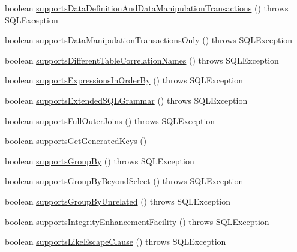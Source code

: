 \begin{DoxyCompactItemize}
\item 
boolean \mbox{\hyperlink{classcom_1_1mysql_1_1jdbc_1_1_database_meta_data_a661e1614b3b0914c06d415bf42e2791a}{supports\+Data\+Definition\+And\+Data\+Manipulation\+Transactions}} ()  throws S\+Q\+L\+Exception 
\item 
boolean \mbox{\hyperlink{classcom_1_1mysql_1_1jdbc_1_1_database_meta_data_aac4b26ebdbb4f45c9e05b77a6a2a0acf}{supports\+Data\+Manipulation\+Transactions\+Only}} ()  throws S\+Q\+L\+Exception 
\item 
boolean \mbox{\hyperlink{classcom_1_1mysql_1_1jdbc_1_1_database_meta_data_a45588ceb84a8c79a3134663876bd9cf6}{supports\+Different\+Table\+Correlation\+Names}} ()  throws S\+Q\+L\+Exception 
\item 
boolean \mbox{\hyperlink{classcom_1_1mysql_1_1jdbc_1_1_database_meta_data_a4ca7a6366d8496681da61acb961c6b67}{supports\+Expressions\+In\+Order\+By}} ()  throws S\+Q\+L\+Exception 
\item 
boolean \mbox{\hyperlink{classcom_1_1mysql_1_1jdbc_1_1_database_meta_data_ae4ba0f70d5cc49de6dad934fd7d66428}{supports\+Extended\+S\+Q\+L\+Grammar}} ()  throws S\+Q\+L\+Exception 
\item 
boolean \mbox{\hyperlink{classcom_1_1mysql_1_1jdbc_1_1_database_meta_data_a254eb9a774fd0248fe46427fab12c502}{supports\+Full\+Outer\+Joins}} ()  throws S\+Q\+L\+Exception 
\item 
boolean \mbox{\hyperlink{classcom_1_1mysql_1_1jdbc_1_1_database_meta_data_a57810f75b0cc8c43ce7a49b34857217a}{supports\+Get\+Generated\+Keys}} ()
\item 
boolean \mbox{\hyperlink{classcom_1_1mysql_1_1jdbc_1_1_database_meta_data_a8d9c357f9332e96e96a62712c1516c6d}{supports\+Group\+By}} ()  throws S\+Q\+L\+Exception 
\item 
boolean \mbox{\hyperlink{classcom_1_1mysql_1_1jdbc_1_1_database_meta_data_ad84c026b70e4497b4972f2a24bcf8e72}{supports\+Group\+By\+Beyond\+Select}} ()  throws S\+Q\+L\+Exception 
\item 
boolean \mbox{\hyperlink{classcom_1_1mysql_1_1jdbc_1_1_database_meta_data_acfa14da367846c214e85c5133ece8d9e}{supports\+Group\+By\+Unrelated}} ()  throws S\+Q\+L\+Exception 
\item 
boolean \mbox{\hyperlink{classcom_1_1mysql_1_1jdbc_1_1_database_meta_data_aaed7a682d01435e4df3246e3c2f4bcc2}{supports\+Integrity\+Enhancement\+Facility}} ()  throws S\+Q\+L\+Exception 
\item 
boolean \mbox{\hyperlink{classcom_1_1mysql_1_1jdbc_1_1_database_meta_data_a5a57fbcc91beaca2eceedb46f41cc2ca}{supports\+Like\+Escape\+Clause}} ()  throws S\+Q\+L\+Exception 

\end{DoxyCompactItemize}
